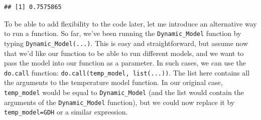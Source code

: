 \documentclass[
]{book}
\newenvironment{Shaded}{\begin{snugshade}}{\end{snugshade}}
\newcommand{\CommentTok}[1]{\textcolor[rgb]{0.56,0.35,0.01}{\textit{#1}}}
\newcommand{\DataTypeTok}[1]{\textcolor[rgb]{0.13,0.29,0.53}{#1}}
\newcommand{\DecValTok}[1]{\textcolor[rgb]{0.00,0.00,0.81}{#1}}
\newcommand{\KeywordTok}[1]{\textcolor[rgb]{0.13,0.29,0.53}{\textbf{#1}}}
\newcommand{\NormalTok}[1]{#1}
\newcommand{\OperatorTok}[1]{\textcolor[rgb]{0.81,0.36,0.00}{\textbf{#1}}}
\begin{document}
\begin{Shaded}
\end{Shaded}

\begin{verbatim}
## [1] 0.7575865
\end{verbatim}

To be able to add flexibility to the code later, let me introduce an alternative way to run a function. So far, we've been running the \texttt{Dynamic\_Model} function by typing \texttt{Dynamic\_Model(...)}. This is easy and straightforward, but assume now that we'd like our function to be able to run different models, and we want to pass the model into our function as a parameter. In such cases, we can use the \texttt{do.call} function: \texttt{do.call(temp\_model,\ list(...))}. The list here contains all the arguments to the temperature model function. In our original case, \texttt{temp\_model} would be equal to \texttt{Dynamic\_Model} (and the list would contain the arguments of the \texttt{Dynamic\_Model} function), but we could now replace it by \texttt{temp\_model=GDH} or a similar expression.
\end{document}
